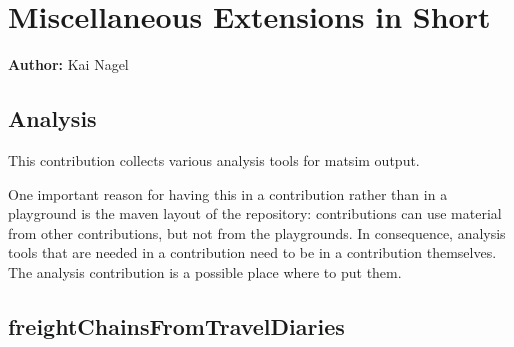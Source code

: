 \chapter{Miscellaneous Extensions in Short}
\label{ch:misccontribs}

\hfill \textbf{Author:} Kai Nagel

\section{Analysis}
\label{sec:contrib-analysis}





This \gls{contribution} collects various analysis tools for \gls{matsim} output.  

One important reason for having this in a \gls{contribution} rather than in a playground is the \gls{maven} layout of the repository: \Glspl{contribution} can use material from other \glspl{contribution}, but not from the playgrounds. 
In consequence, analysis tools that are needed in a \gls{contribution} need to be in a \gls{contribution} themselves. 
The analysis \gls{contribution} is a possible place where to put them.

\section{freightChainsFromTravelDiaries}
\label{sec:freightChainsFromTravelDiaries}

